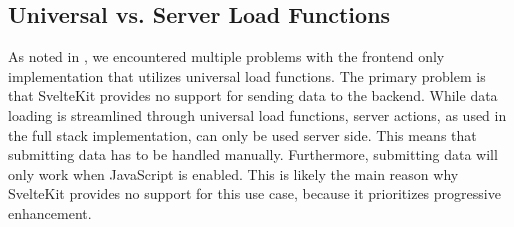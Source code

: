 
\subsection{Universal vs. Server Load Functions}
\label{sec:evaluation-universal}
As noted in , we encountered multiple problems with the frontend only implementation that utilizes universal load functions. The primary problem is that SvelteKit provides no support for sending data to the backend. While data loading is streamlined through universal load functions, server actions, as used in the full stack implementation, can only be used server side. This means that submitting data has to be handled manually. Furthermore, submitting data will only work when JavaScript is enabled. This is likely the main reason why SvelteKit provides no support for this use case, because it prioritizes progressive enhancement.






